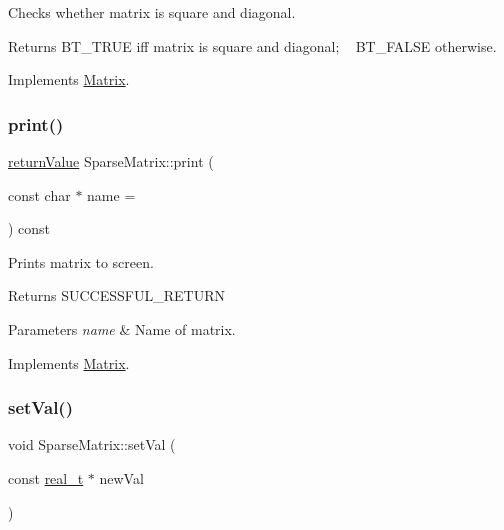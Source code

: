 Checks whether matrix is square and diagonal. \begin{DoxyReturn}{Returns}
B\+T\+\_\+\+T\+R\+UE iff matrix is square and diagonal; ~\newline
 B\+T\+\_\+\+F\+A\+L\+SE otherwise. 
\end{DoxyReturn}


Implements \hyperlink{class_matrix_a1f5595f0147658d9f79f92dd283dcbac}{Matrix}.

\mbox{\label{class_sparse_matrix_aa27acfde647c2648d1b8e71a0a53c39e}} 
\subsubsection{\texorpdfstring{print()}{print()}}
{\footnotesize\ttfamily \hyperlink{_message_handling_8hpp_a81d556f613bfbabd0b1f9488c0fa865e}{return\+Value} Sparse\+Matrix\+::print (\begin{DoxyParamCaption}\item[{const char $\ast$}]{name = {} }\end{DoxyParamCaption}) const\hspace{0.3cm}{\ttfamily [virtual]}}

Prints matrix to screen. \begin{DoxyReturn}{Returns}
S\+U\+C\+C\+E\+S\+S\+F\+U\+L\+\_\+\+R\+E\+T\+U\+RN 
\end{DoxyReturn}

\begin{DoxyParams}{Parameters}
{\em name} & Name of matrix. \\
\hline
\end{DoxyParams}


Implements \hyperlink{class_matrix_acc4e1dc7fa487a0c2638d88236fe35f8}{Matrix}.

\mbox{\label{class_sparse_matrix_a0b1ea9f7a3b65c583244d94acb9ea658}} 
\subsubsection{\texorpdfstring{set\+Val()}{setVal()}}
{\footnotesize\ttfamily void Sparse\+Matrix\+::set\+Val (\begin{DoxyParamCaption}\item[{const \hyperlink{qp_o_a_s_e_s__wrapper_8h_a0d00e2b3dfadee81331bbb39068570c4}{real\+\_\+t} $\ast$}]{new\+Val }\end{DoxyParamCaption})\hspace{0.3cm}{\ttfamily [virtual]}}

